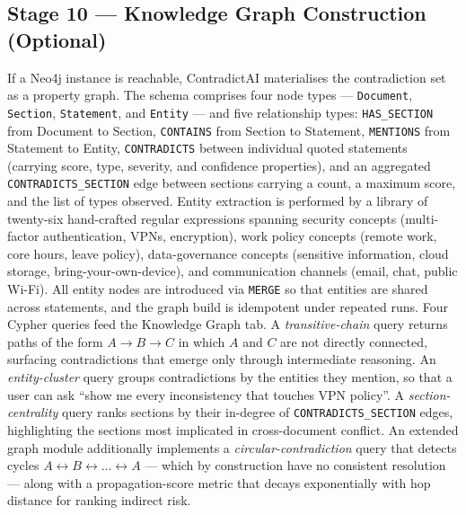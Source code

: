 \documentclass[conference]{IEEEtran}
\begin{document}
\subsection{Stage 10 --- Knowledge Graph Construction (Optional)}
If a Neo4j instance is reachable, ContradictAI materialises the contradiction set as a property graph. The schema comprises four node types --- \texttt{Document}, \texttt{Section}, \texttt{Statement}, and \texttt{Entity} --- and five relationship types: \texttt{HAS\_SECTION} from Document to Section, \texttt{CONTAINS} from Section to Statement, \texttt{MENTIONS} from Statement to Entity, \texttt{CONTRADICTS} between individual quoted statements (carrying score, type, severity, and confidence properties), and an aggregated \texttt{CONTRADICTS\_SECTION} edge between sections carrying a count, a maximum score, and the list of types observed.
Entity extraction is performed by a library of twenty-six hand-crafted regular expressions spanning security concepts (multi-factor authentication, VPNs, encryption), work policy concepts (remote work, core hours, leave policy), data-governance concepts (sensitive information, cloud storage, bring-your-own-device), and communication channels (email, chat, public Wi-Fi). All entity nodes are introduced via \texttt{MERGE} so that entities are shared across statements, and the graph build is idempotent under repeated runs.
Four Cypher queries feed the Knowledge Graph tab. A \emph{transitive-chain} query returns paths of the form $A \rightarrow B \rightarrow C$ in which $A$ and $C$ are not directly connected, surfacing contradictions that emerge only through intermediate reasoning. An \emph{entity-cluster} query groups contradictions by the entities they mention, so that a user can ask ``show me every inconsistency that touches VPN policy''. A \emph{section-centrality} query ranks sections by their in-degree of \texttt{CONTRADICTS\_SECTION} edges, highlighting the sections most implicated in cross-document conflict. An extended graph module additionally implements a \emph{circular-contradiction} query that detects cycles $A \leftrightarrow B \leftrightarrow \ldots \leftrightarrow A$ --- which by construction have no consistent resolution --- along with a propagation-score metric that decays exponentially with hop distance for ranking indirect risk.
\end{document}
